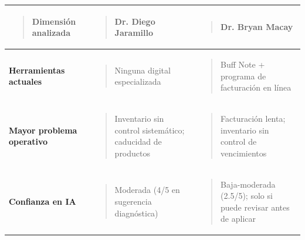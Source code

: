 \documentclass[
]{article}
\newcounter{none} %
\begin{document}
{\def\LTcaptype{none} %
\begin{longtable}[]{@{}
  >{\raggedright\arraybackslash}p{}
  >{\raggedright\arraybackslash}p{}
  >{\raggedright\arraybackslash}p{}@{}}
\toprule\noalign{}
\begin{minipage}[b]{\linewidth}\raggedright
\begin{quote}
\textbf{Dimensión analizada}
\end{quote}
\end{minipage} & \begin{minipage}[b]{\linewidth}\raggedright
\begin{quote}
\textbf{Dr. Diego Jaramillo}
\end{quote}
\end{minipage} & \begin{minipage}[b]{\linewidth}\raggedright
\begin{quote}
\textbf{Dr. Bryan Macay}
\end{quote}
\end{minipage} \\
\midrule\noalign{}
\endhead
\bottomrule\noalign{}
\endlastfoot
\textbf{Herramientas actuales} &
\begin{minipage}[t]{\linewidth}\raggedright
\begin{quote}
Ninguna digital especializada
\end{quote}
\end{minipage} & \begin{minipage}[t]{\linewidth}\raggedright
\begin{quote}
Buff Note + programa de facturación en línea
\end{quote}
\end{minipage} \\
\textbf{Mayor problema operativo} &
\begin{minipage}[t]{\linewidth}\raggedright
\begin{quote}
Inventario sin control sistemático; caducidad de productos
\end{quote}
\end{minipage} & \begin{minipage}[t]{\linewidth}\raggedright
\begin{quote}
Facturación lenta; inventario sin control de vencimientos
\end{quote}
\end{minipage} \\
\textbf{Confianza en IA} & \begin{minipage}[t]{\linewidth}\raggedright
\begin{quote}
Moderada (4/5 en sugerencia diagnóstica)
\end{quote}
\end{minipage} & \begin{minipage}[t]{\linewidth}\raggedright
\begin{quote}
Baja-moderada (2.5/5); solo si puede revisar antes de aplicar
\end{quote}
\end{minipage} \\
\end{longtable}
}
\end{document}
